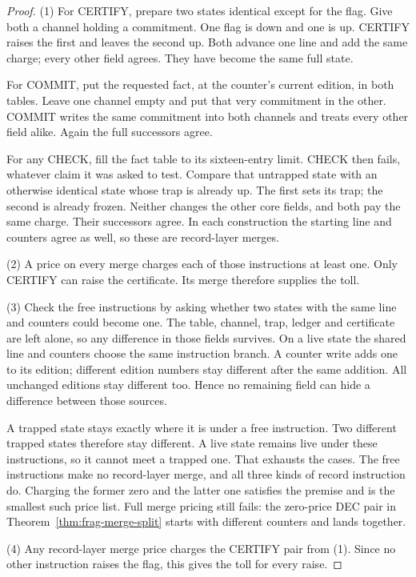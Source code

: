 \documentclass[11pt,twoside]{article}
\theoremstyle{thielethm}
\theoremstyle{thieledef}
\theoremstyle{thieledef}
\theoremstyle{thieledef}
\theoremstyle{thielethm}
\theoremstyle{thieleobs}
\theoremstyle{thielethm}
\begin{document}
\begin{proof}
(1) For CERTIFY, prepare two states identical except for the flag. Give both a
channel holding a commitment. One flag is down and one is up. CERTIFY raises the
first and leaves the second up. Both advance one line and add the same charge;
every other field agrees. They have become the same full state.

For COMMIT, put the requested fact, at the counter's current edition, in both
tables. Leave one channel empty and put that very commitment in the other.
COMMIT writes the same commitment into both channels and treats every other
field alike. Again the full successors agree.

For any CHECK, fill the fact table to its sixteen-entry limit. CHECK then fails,
whatever claim it was asked to test. Compare that untrapped state with an otherwise
identical state whose trap is already up. The first sets its trap; the second is
already frozen. Neither changes the other core fields, and both pay the same
charge. Their successors agree. In each construction the starting line and
counters agree as well, so these are record-layer merges.

(2) A price on every merge charges each of those instructions at least one.
Only CERTIFY can raise the certificate. Its merge therefore supplies the toll.

(3) Check the free instructions by asking whether two states with the same line
and counters could become one. The table, channel, trap, ledger and certificate
are left alone, so any difference in those fields survives. On a live state the
shared line and counters choose the same instruction branch. A counter write
adds one to its edition; different edition numbers stay different after the same
addition. All unchanged editions stay different too. Hence no remaining field
can hide a difference between those sources.

A trapped state stays exactly where it is under a free instruction. Two different
trapped states therefore stay different. A live state remains live under these
instructions, so it cannot meet a trapped one. That exhausts the cases.
The free instructions make no record-layer merge, and all three kinds of record
instruction do. Charging the former zero and the latter one satisfies the premise
and is the smallest such price list. Full merge pricing still fails: the zero-price
DEC pair in Theorem~\ref{thm:frag-merge-split} starts with different counters and
lands together.

(4) Any record-layer merge price charges the CERTIFY pair from (1).
Since no other instruction raises the flag, this gives the toll for every raise.
\end{proof}
\end{document}
